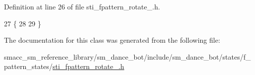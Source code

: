 Definition at line 26 of file sti\+\_\+fpattern\+\_\+rotate\+\_.\+h.


\begin{DoxyCode}
27   \{
28     
29   \}
\end{DoxyCode}


The documentation for this class was generated from the following file\+:\begin{DoxyCompactItemize}
\item 
smacc\+\_\+sm\+\_\+reference\+\_\+library/sm\+\_\+dance\+\_\+bot/include/sm\+\_\+dance\+\_\+bot/states/f\+\_\+pattern\+\_\+states/\hyperlink{sti__fpattern__rotate__1_8h}{sti\+\_\+fpattern\+\_\+rotate\+\_.\+h}\end{DoxyCompactItemize}
